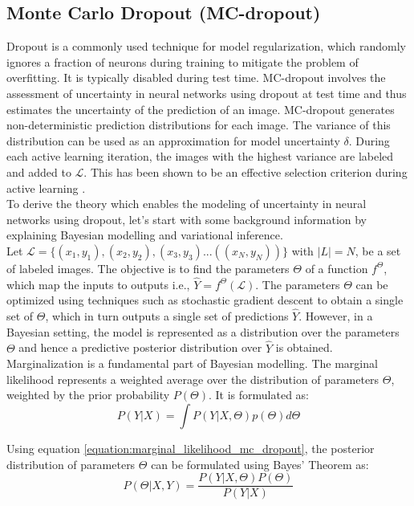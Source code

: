 \subsection{Monte Carlo Dropout (MC-dropout)}
Dropout \cite{srivastava2014} is a commonly used technique for model regularization, which randomly ignores a fraction of neurons during training to mitigate the problem of overfitting. It is typically disabled during test time. MC-dropout involves the assessment of uncertainty in neural networks using dropout at test time \cite{gal2016, gal2016phd} and thus estimates the uncertainty of the prediction of an image. MC-dropout generates non-deterministic prediction distributions for each image. The variance of this distribution can be used as an approximation for model uncertainty $\delta$. During each active learning iteration, the images with the highest variance are labeled and added to $\mathcal{L}$. This has been shown to be an effective selection criterion during active learning \cite{gal2016}. \\
To derive the theory which enables the modeling of uncertainty in neural networks using dropout, let's start with some background information by explaining Bayesian modelling and variational inference. \\ Let $\mathcal{L} = \{(x_1, y_1), (x_2, y_2), (x_3, y_3) ... ((x_N, y_N))\}$ with $|L| = N$, be a set of labeled images. The objective is to find the parameters $\Theta$ of a function $f^\Theta$, which map the inputs to outputs i.e., $\hat{Y} = f^\Theta(\mathcal{L})$. The parameters $\Theta$ can be optimized using techniques such as stochastic gradient descent to obtain a single set of $\Theta$, which in turn outputs a single set of predictions $\hat{Y}$. However, in a Bayesian setting, the model is represented as a distribution over the parameters $\Theta$ and hence a predictive posterior distribution over $\hat{Y}$ is obtained. Marginalization is a fundamental part of Bayesian modelling. The marginal likelihood represents a weighted average over the distribution of parameters $\Theta$, weighted by the prior probability $P(\Theta)$. It is formulated as:
\begin{equation}
    \label{equation:marginal_likelihood_mc_dropout}
    P(Y | X) = \int P(Y | X, \Theta) p(\Theta) d\Theta
\end{equation}

Using equation \ref{equation:marginal_likelihood_mc_dropout}, the posterior distribution of parameters $\Theta$ can be formulated using Bayes' Theorem as:
\begin{equation}
    \label{equation:post_dist_theta_mc_dropout}
    P(\Theta | X, Y) = \frac{P(Y | X, \Theta) P (\Theta)}{P(Y | X)}
\end{equation}

